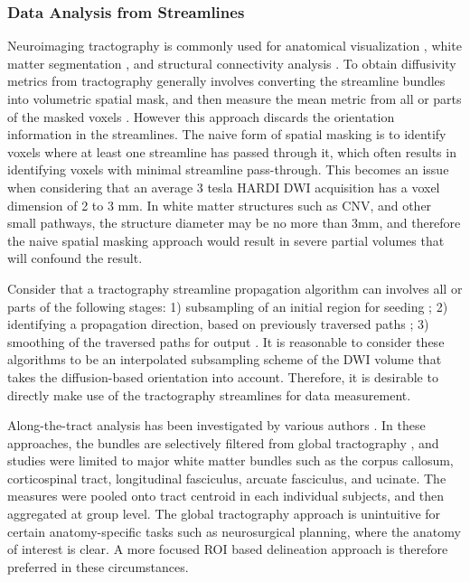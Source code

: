 \subsubsection{Data Analysis from Streamlines}
Neuroimaging tractography is commonly used for anatomical visualization \cite{Chen2011b}, white matter segmentation \cite{Behrens2003a,Johansen-Berg2005}, and structural connectivity analysis \cite{Cao2013,Wiech2014}. To obtain diffusivity metrics from tractography generally involves converting the streamline bundles into volumetric spatial mask, and then measure the mean metric from all or parts of the masked voxels \cite{Concha2005,Fitzsimmons2009}. However this approach discards the orientation information in the streamlines. The naive form of spatial masking is to identify voxels where at least one streamline has passed through it, which often results in identifying voxels with minimal streamline pass-through. This becomes an issue when considering that an average 3 tesla HARDI DWI acquisition has a voxel dimension of 2 to 3 mm. In white matter structures such as CNV, and other small pathways, the structure diameter may be no more than 3mm, and therefore the naive spatial masking approach would result in severe partial volumes that will confound the result. 

Consider that a tractography streamline propagation algorithm can involves all or parts of the following stages: 1) subsampling of an initial region for seeding \cite{Basser2002,Cote2012}; 2) identifying a propagation direction, based on previously traversed paths \cite{Malcolm2010,Qazi2009,Tournier2010}; 3) smoothing of the traversed paths for output \cite{Tuch2000d}. It is reasonable to consider these algorithms to be an interpolated subsampling scheme of the DWI volume that takes the diffusion-based orientation into account. Therefore, it is desirable to directly make use of the tractography streamlines for data measurement. 

Along-the-tract analysis has been investigated by various authors \cite{Colby2012,ODonnell2009,Wang2015,Yeatman2012}. In these approaches, the bundles are selectively filtered from global tractography \cite{Wang2015,Yeatman2012}, and studies were limited to major white matter bundles such as the corpus callosum, corticospinal tract, longitudinal fasciculus, arcuate fasciculus, and ucinate. The measures were pooled onto tract centroid in each individual subjects, and then aggregated at group level. The global tractography approach is unintuitive for certain anatomy-specific tasks such as neurosurgical planning, where the anatomy of interest is clear. A more focused ROI based delineation approach is therefore preferred in these circumstances.

